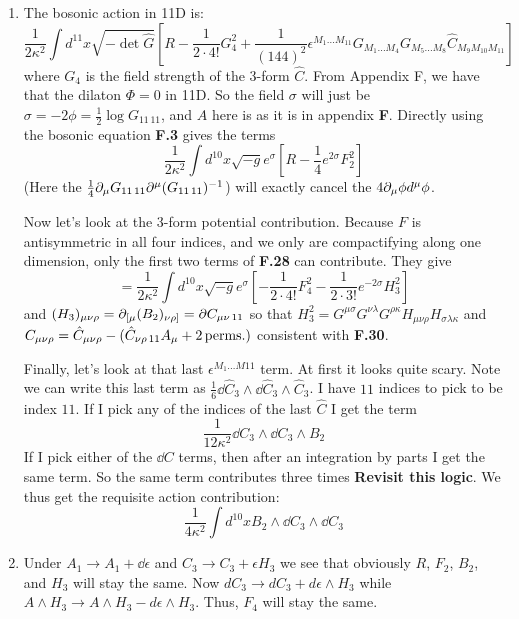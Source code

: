 \documentclass[11pt, class=article, crop=false]{standalone}
\begin{document}
\begin{enumerate}
	\item The bosonic action in 11D is:
	\[
		\frac{1}{2\kappa^2} \int d^{11} x \sqrt{-\det \hat G} \left[R - \frac{1}{2 \cdot 4!} G_4^2 + \frac{1}{(144)^2} \epsilon^{M_1 \dots M_{11}} G_{M_1 \dots M_4} G_{M_5 \dots M_8} \hat C_{M_9 M_{10} M_{11}}\right]
	\]
	where $G_4$ is the field strength of the 3-form $\hat C$. From Appendix F, we have that the dilaton $\Phi = 0$ in 11D. So the field $\sigma$ will just be $\sigma = -2\phi = \frac12 \log G_{11\, 11}$, and $A$ here is as it is in appendix \textbf{F}. Directly using the bosonic equation \textbf{F.3} gives the terms
	\[
		\frac{1}{2\kappa^2 }\int d^{10} x \sqrt{-g} e^{\sigma} \left[R - \frac14 e^{2\sigma} F_2^2  \right]
	\]
	(Here the $\frac14 \partial_\mu G_{11\, 11} \partial^\mu (G_{11\, 11})^{-1}$) will exactly cancel the $4 \partial_\mu \phi d^\mu \phi$. 
	
	Now let's look at the $3$-form potential contribution. Because $F$ is antisymmetric in all four indices, and we only are compactifying along one dimension, only the first two terms of \textbf{F.28} can contribute. They give
	\[
		=\frac{1}{2\kappa^2} \int d^{10} x \sqrt{-g} e^\sigma \left[-\frac{1}{2 \cdot 4!} F_4^2 - \frac{1}{2 \cdot 3!} e^{-2\sigma} H_3^2 \right]
	\]
	and $(H_3)_{\mu \nu \rho} = \partial_{[\mu} (B_2)_{\nu \rho]} = \partial C_{\mu \nu\, 11}$ so that $H_3^2 = G^{\mu \sigma} G^{\nu \lambda} G^{\rho \kappa} H_{\mu \nu \rho} H_{\sigma \lambda \kappa}$ and $C_{\mu \nu \rho} = \hat C_{\mu \nu \rho} - (\hat C_{\nu \rho\, 11} A_\mu + 2 \,\mathrm{perms.})$  consistent with \textbf{F.30}.

	Finally, let's look at that last $\epsilon^{M_1 \dots M{11}}$ term. At first it looks quite scary. Note we can write this last term as $\frac16 \dd \hat C_3 \wedge \dd \hat C_3 \wedge \hat C_3$. I have $11$ indices to pick to be index $11$. If I pick any of the indices of the last $\hat C$ I get the term
	\[
		\frac{1}{12 \kappa^2} \dd C_3 \wedge \dd C_3 \wedge B_2
	\]
	If I pick either of the $\dd C$ terms, then after an integration by parts I get the same term. So the same term contributes three times \textbf{Revisit this logic}. We thus get the requisite action contribution:
	\[
		\frac{1}{4\kappa^2} \int d^{10} x B_2 \wedge \dd C_3 \wedge \dd C_3
	\]
	\item Under $A_1 \to A_1 + \dd \epsilon$ and $C_3 \to C_3 + \epsilon H_3$ we see that obviously $R$, $F_2$, $B_2$, and $H_3$ will stay the same. Now $dC_3 \to dC_3 + d\epsilon \wedge H_3$ while $A \wedge H_3 \to A \wedge H_3 - d \epsilon \wedge H_3$. Thus, $F_4$ will stay the same. 
	

\end{enumerate}
\end{document}
